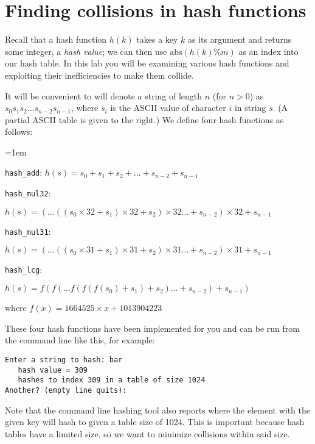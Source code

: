 \section*{Finding collisions in hash functions}

\bgroup


Recall that a hash function $h(k)$ takes a key $k$ as its argument and
returns some integer, a \emph{hash value}; we can then use
$\textrm{abs}(h(k) \% m)$ as an index into our hash table.  In this
lab you will be examining various hash functions and exploiting their
inefficiencies to make them collide.

It will be convenient to will denote a string of length $n$ (for $n>0$) as
$s_0s_1s_2...s_{n-2}s_{n-1}$, where $s_i$ is the ASCII value of
character $i$ in string $s$.  (A partial ASCII table is given to the
right.)  We define four hash functions as follows:

\begin{description}
=1em
\item\lstinline'hash_add':
$h(s) = s_0 + s_1 + s_2 + \dots + s_{n-2} + s_{n-1}$

\item\lstinline'hash_mul32':

\hspace*{-1.9em}%
$h(s) = ( \dots ((s_0 \times 32 + s_1) \times 32 + s_2) \times 32 \dots + s_{n-2}) \times 32 + s_{n-1}$

\item\lstinline'hash_mul31':

\hspace*{-1.9em}%
$h(s) = ( \dots ((s_0 \times 31 + s_1) \times 31 + s_2) \times 31 \dots + s_{n-2}) \times 31 + s_{n-1}$

\item\lstinline'hash_lcg':

$h(s) = f(f( \dots f(f(f(s_0) + s_1) + s_2) \dots + s_{n-2}) + s_{n-1})$

\hspace*{-1.9em}%
where $f(x) = 1664525 \times x + 1013904223$
\end{description}

\medskip
These four hash functions have been implemented for you and can be run
from the command line like this, for example:

\begin{lstlisting}[language={[coin]C}]
% hash_add
Enter a string to hash: bar
   hash value = 309
   hashes to index 309 in a table of size 1024
Another? (empty line quits):
\end{lstlisting}
Note that the command line hashing tool also reports where the element
with the given key will hash to given a table size of 1024. This is
important because hash tables have a limited size, so we want to
minimize collisions within said size.
\egroup

